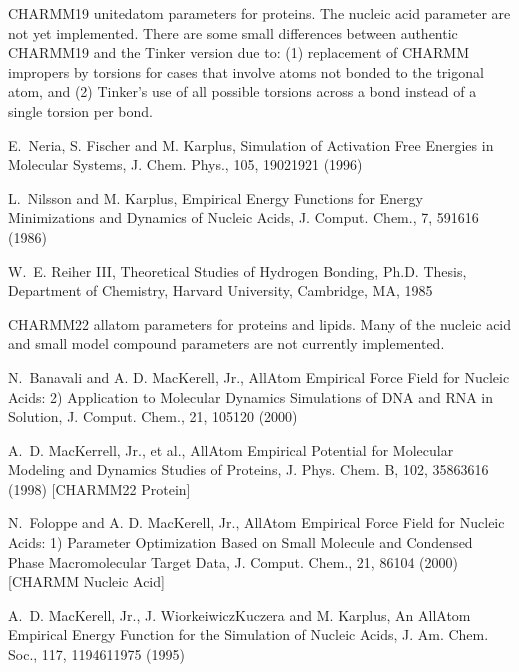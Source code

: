 \documentclass[letterpaper,11pt,english]{sphinxmanual}
\begin{document}
\sphinxAtStartPar
{}

\sphinxAtStartPar
CHARMM19 united\sphinxhyphen{}atom parameters for proteins. The nucleic acid parameter are not yet implemented. There are some small differences between authentic CHARMM19 and the Tinker version due to: (1) replacement of CHARMM impropers by torsions for cases that involve atoms not bonded to the trigonal atom, and (2) Tinker’s use of all possible torsions across a bond instead of a single torsion per bond.

\sphinxAtStartPar
E. Neria, S. Fischer and M. Karplus, Simulation of Activation Free Energies in Molecular Systems, J. Chem. Phys., 105, 1902\sphinxhyphen{}1921 (1996)

\sphinxAtStartPar
L. Nilsson and M. Karplus, Empirical Energy Functions for Energy Minimizations and Dynamics of Nucleic Acids, J. Comput. Chem., 7, 591\sphinxhyphen{}616 (1986)

\sphinxAtStartPar
W. E. Reiher III, Theoretical Studies of Hydrogen Bonding, Ph.D. Thesis, Department of Chemistry, Harvard University, Cambridge, MA, 1985

\sphinxAtStartPar
{}

\sphinxAtStartPar
CHARMM22 all\sphinxhyphen{}atom parameters for proteins and lipids. Many of the nucleic acid and small model compound parameters are not currently implemented.

\sphinxAtStartPar
N. Banavali and A. D. MacKerell, Jr., All\sphinxhyphen{}Atom Empirical Force Field for Nucleic Acids: 2) Application to Molecular Dynamics Simulations of DNA and RNA in Solution, J. Comput. Chem., 21, 105\sphinxhyphen{}120 (2000)

\sphinxAtStartPar
A. D. MacKerrell, Jr., et al., All\sphinxhyphen{}Atom Empirical Potential for Molecular Modeling and Dynamics Studies of Proteins, J. Phys. Chem. B, 102, 3586\sphinxhyphen{}3616 (1998)  {[}CHARMM22 Protein{]}

\sphinxAtStartPar
N. Foloppe and A. D. MacKerell, Jr., All\sphinxhyphen{}Atom Empirical Force Field for Nucleic Acids: 1) Parameter Optimization Based on Small Molecule and Condensed Phase Macromolecular Target Data, J. Comput. Chem., 21, 86\sphinxhyphen{}104 (2000)  {[}CHARMM Nucleic Acid{]}

\sphinxAtStartPar
A. D. MacKerell, Jr., J. Wiorkeiwicz\sphinxhyphen{}Kuczera and M. Karplus, An All\sphinxhyphen{}Atom Empirical Energy Function for the Simulation of Nucleic Acids, J. Am. Chem. Soc., 117, 11946\sphinxhyphen{}11975 (1995)
\end{document}
